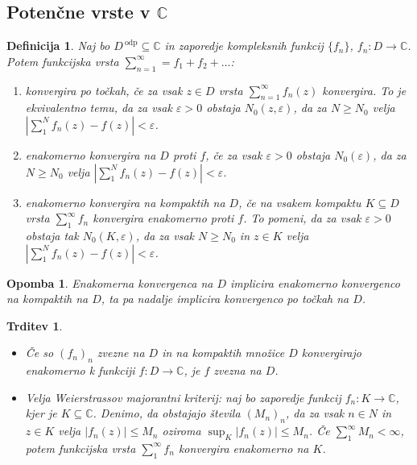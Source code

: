 \documentclass[10pt, a4paper]{article}
\newtheorem{trditev}[izr]{Trditev}
\newtheorem{defi}{Definicija}[section]
\newenvironment{noticeB}{%
  \tcolorbox[%
  notitle,
  empty,
  enhanced,  %
  breakable,
  coltext=black,
  colback=white, 
  fontupper=\rmfamily,
  parbox=false,
  noparskip,
  sharp corners,
  boxrule=-1pt,  %
  frame hidden,
  left=7pt,  %
  right=7pt,
  top=5pt,
  bottom=5pt,
  before skip=2.5ex plus 2pt,
  after skip=2.5ex plus 2pt,
  borderline west = {1.5pt}{-0.1pt}{blue!30!black}, %
  overlay unbroken and last={%
    \draw[color=black, line width=1.25pt]
    ($(frame.south west)+(1.pt, -0.1pt)$) -- ++(2em, 0);
  }
  ]}
{\endtcolorbox}
\newenvironment{definicija}{\begin{defi}\begin{noticeB}}{%
    \end{noticeB}\end{defi}}
\newtheorem*{opomba}{Opomba}
\newcommand{\C}{\mathbb {C}}
\begin{document}
\subsection{Potenčne vrste v $\C$}

\begin{definicija}
  Naj bo $D^{\ \text{odp}} \subseteq \C$ in zaporedje kompleksnih funkcij $\{f_n\}$, $f_n : D \to \C$.
  Potem funkcijska vrsta $\sum_{n = 1} ^\infty = f_1 + f_2 + \dots$:
  \begin{enumerate}
    \item konvergira po točkah, če za vsak $z \in D$ vrsta $\sum_{n = 1}^\infty f_n (z)$ konvergira.
    To je ekvivalentno temu, da za vsak $\varepsilon > 0$ obstaja $N_0 (z, \varepsilon)$,
    da za $N \geq N_0$ velja $\left|\sum_1 ^{N} f_n (z) - f(z)\right| < \varepsilon$.
    \item enakomerno konvergira na $D$ proti $f$, če za vsak $\varepsilon > 0$ obstaja $N_0 (\varepsilon)$,
    da za $N \geq N_0$ velja $\left|\sum_1 ^{N} f_n (z) - f(z)\right| < \varepsilon$.
    \item enakomerno konvergira na kompaktih na $D$, če na vsakem kompaktu $K \subseteq D$
    vrsta $\sum_1 ^\infty f_n$ konvergira enakomerno proti $f$. To pomeni, da za vsak $\varepsilon > 0$
    obstaja tak $N_0(K, \varepsilon)$, da za vsak $N \geq N_0$ in $z \in K$ velja $\left|\sum_1 ^{N} f_n (z) - f(z)\right| < \varepsilon$. 
  \end{enumerate}
\end{definicija}

\begin{opomba}
  Enakomerna konvergenca na $D$ implicira enakomerno konvergenco na kompaktih na $D$, 
  ta pa nadalje implicira konvergenco po točkah na $D$.
\end{opomba}

\begin{trditev}
  \begin{itemize}
    \item Če so $(f_n)_n$ zvezne na $D$ in na kompaktih množice $D$ konvergirajo enakomerno k funkciji $f: D \to \C$,
    je $f$ zvezna na $D$.
    \item Velja Weierstrassov majorantni kriterij: naj bo zaporedje funkcij $f_n : K \to \C$,
    kjer je $K \subseteq \C$. Denimo, da obstajajo števila $(M_n)_n$, da za vsak $n \in N$
    in $z \in K$ velja $|f_n(z)| \leq M_n$ oziroma $\sup_K |f_n(z)| \leq M_n$.
    Če $\sum_1 ^\infty M_n < \infty$, potem funkcijska vrsta $\sum_1 ^\infty f_n$ konvergira enakomerno na $K$.
  \end{itemize}
\end{trditev}
\end{document}

